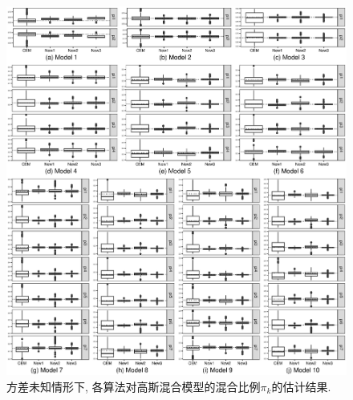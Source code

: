 \documentclass[a4paper,12pt,openany,oneside,utf-8]{ctexbook}
\begin{document}
\begin{figure}[p]
  \centering
  \includegraphics[width = 1\textwidth]{Figure_4_Estimates_for_the_mixing_proportions_for_normal_mixture_models_with_unknown_sigma.eps}
  \caption{方差未知情形下, 各算法对高斯混合模型的混合比例$\pi_k$的估计结果.}
  \label{fig:Estimates for the mixing proportions for normal mixture models 1-10 with unknown sigma based on 500 replicates} %
\end{figure}
\end{document}
